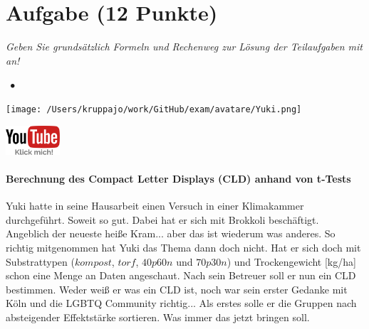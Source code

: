 \documentclass[a4paper, 9pt]{scrartcl}\usepackage[]{graphicx}\usepackage[]{xcolor}
\begin{document}
 
\clearpage

\section{Aufgabe \hfill (12 Punkte)}

\textit{Geben Sie grundsätzlich Formeln und Rechenweg zur Lösung der Teilaufgaben mit an!} \\[1Ex]
 

 
\ifcollection
\begin{flushright}
\tiny\vspace{-3Ex}
\textbf{\examinhaltstart}
\exammodulestatversuch $\;\bullet$
\exammodulebiostat
\vspace{-4Ex}
\end{flushright}
\begin{minipage}[t]{0.5\textwidth}
\texttt{[image: /Users/kruppajo/work/GitHub/exam/avatare/Yuki.png]}
\end{minipage}
\begin{minipage}[t]{0.5\textwidth}
\hfill
\href{https://youtu.be/951MNUXdqwA}{\includegraphics[width = 2cm]{img/youtube}}
\end{minipage}
\vspace{-3ex}
\fi



\ifcollection
\paragraph{Berechnung des Compact Letter Displays (CLD) anhand von t-Tests}
\fi

Yuki hatte in seine Hausarbeit einen Versuch in einer Klimakammer durchgeführt. Soweit so gut. Dabei hat er sich mit Brokkoli beschäftigt. Angeblich der neueste heiße Kram... aber das ist wiederum was anderes. So richtig mitgenommen hat Yuki das Thema dann doch nicht. Hat er sich doch mit Substrattypen ($kompost$, $torf$, $40p60n$ und $70p30n$) und Trockengewicht [kg/ha] schon eine Menge an Daten angeschaut. Nach sein Betreuer soll er nun ein CLD bestimmen. Weder weiß er was ein CLD ist, noch war sein erster Gedanke mit Köln und die LGBTQ Community richtig... Als erstes solle er die Gruppen nach absteigender Effektstärke sortieren. Was immer das jetzt bringen soll.
\end{document}
